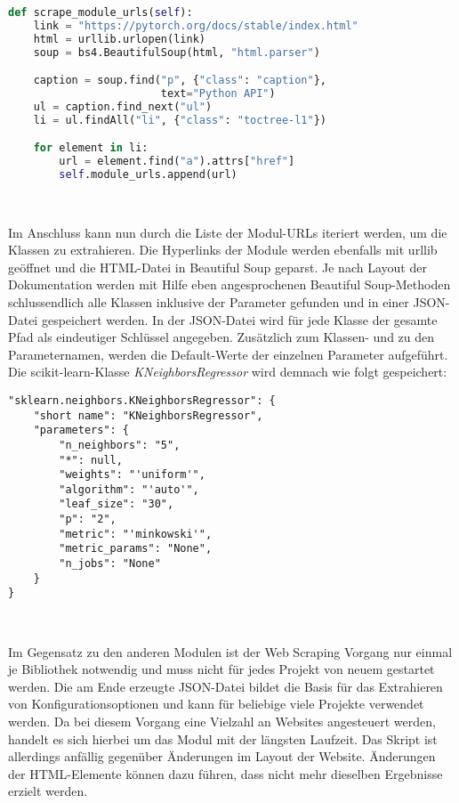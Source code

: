 \documentclass[german,bachelor]{swsLeipzig}
\begin{document}
\noindent\begin{minipage}{\linewidth}
\begin{lstlisting}[language=Python, frame=single, label=scrape_moduls, basicstyle=\small, caption={Web Scraping der Modul-URLs von PyTorch},captionpos=b]
def scrape_module_urls(self):
    link = "https://pytorch.org/docs/stable/index.html"
    html = urllib.urlopen(link)
    soup = bs4.BeautifulSoup(html, "html.parser")

    caption = soup.find("p", {"class": "caption"},
                        text="Python API")
    ul = caption.find_next("ul")
    li = ul.findAll("li", {"class": "toctree-l1"})

    for element in li:
        url = element.find("a").attrs["href"]
        self.module_urls.append(url)
\end{lstlisting}
\end{minipage}
\

Im Anschluss kann nun durch die Liste der Modul-URLs iteriert werden, um die Klassen zu extrahieren.
Die Hyperlinks der Module werden ebenfalls mit urllib geöffnet und die HTML-Datei in Beautiful Soup geparst.
Je nach Layout der Dokumentation werden mit Hilfe eben angesprochenen Beautiful Soup-Methoden schlussendlich alle
Klassen inklusive der Parameter gefunden und in einer JSON-Datei gespeichert werden.
In der JSON-Datei wird für jede Klasse der gesamte Pfad als eindeutiger Schlüssel angegeben.
Zusätzlich zum Klassen- und zu den Parameternamen, werden die Default-Werte der einzelnen Parameter aufgeführt.
Die scikit-learn-Klasse \textit{KNeighborsRegressor} wird demnach wie folgt gespeichert:\\

\noindent\begin{minipage}{\linewidth}
\begin{lstlisting}[frame=single, label=json_scraping, basicstyle=\small, caption={Web Scraping Ergebnis der KNeighborsRegressor-Klasse aus scikit-learn},captionpos=b]
"sklearn.neighbors.KNeighborsRegressor": {
    "short name": "KNeighborsRegressor",
    "parameters": {
        "n_neighbors": "5",
        "*": null,
        "weights": "'uniform'",
        "algorithm": "'auto'",
        "leaf_size": "30",
        "p": "2",
        "metric": "'minkowski'",
        "metric_params": "None",
        "n_jobs": "None"
    }
}
\end{lstlisting}
\end{minipage}
\

Im Gegensatz zu den anderen Modulen ist der Web Scraping Vorgang nur einmal je Bibliothek notwendig und muss nicht für jedes Projekt
von neuem gestartet werden.
Die am Ende erzeugte JSON-Datei bildet die Basis für das Extrahieren von Konfigurationsoptionen und kann für beliebige viele
Projekte verwendet werden.
Da bei diesem Vorgang eine Vielzahl an Websites angesteuert werden, handelt es sich hierbei um das Modul mit der längsten Laufzeit.
Das Skript ist allerdings anfällig gegenüber Änderungen im Layout der Website.
Änderungen der HTML-Elemente können dazu führen, dass nicht mehr dieselben Ergebnisse erzielt werden. \\
\end{document}
